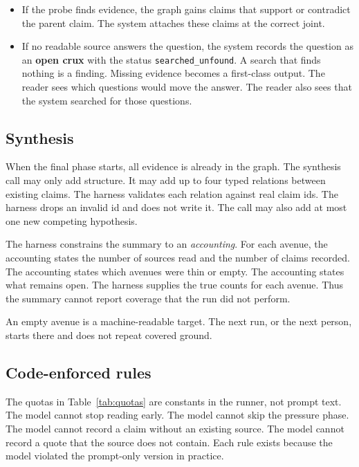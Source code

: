 \documentclass[10pt,twocolumn]{article}
\newcommand{\code}[1]{\texttt{\small #1}}
\begin{document}
\begin{itemize}
\item If the probe finds evidence, the graph gains claims that support or
  contradict the parent claim. The system attaches these claims at the
  correct joint.
\item If no readable source answers the question, the system records the
  question as an \textbf{open crux} with the status
  \code{searched\_unfound}. A search that finds nothing is a finding.
  Missing evidence becomes a first-class output. The reader sees which
  questions would move the answer. The reader also sees that the system
  searched for those questions.
\end{itemize}

\subsection{Synthesis}
\label{sec:accounting}

When the final phase starts, all evidence is already in the graph. The
synthesis call may only add structure. It may add up to four typed
relations between existing claims. The harness validates each relation
against real claim ids. The harness drops an invalid id and does not
write it. The call may also add at most one new competing hypothesis.

The harness constrains the summary to an \emph{accounting}. For each
avenue, the accounting states the number of sources read and the number
of claims recorded. The accounting states which avenues were thin or
empty. The accounting states what remains open. The harness supplies the
true counts for each avenue. Thus the summary cannot report coverage that
the run did not perform.

An empty avenue is a machine-readable target. The next run, or the next
person, starts there and does not repeat covered ground.

\subsection{Code-enforced rules}
\label{sec:harness}

The quotas in Table~\ref{tab:quotas} are constants in the runner, not
prompt text. The model cannot stop reading early. The model cannot skip
the pressure phase. The model cannot record a claim without an existing
source. The model cannot record a quote that the source does not contain.
Each rule exists because the model violated the prompt-only version in
practice.
\end{document}
